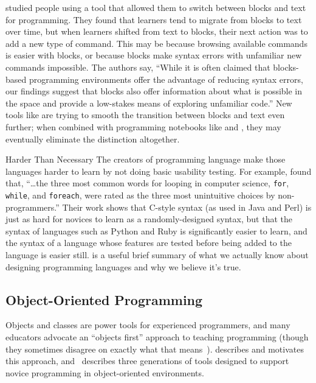 \cite{Wein2017a} studied people using a tool that allowed them to switch between blocks and text for programming. They found that learners tend to migrate from blocks to text over time, but when learners shifted from text to blocks, their next action was to add a new type of command. This may be because browsing available commands is easier with blocks, or because blocks make syntax errors with unfamiliar new commands impossible. The authors say, ``While it is often claimed that blocks-based programming environments offer the advantage of reducing syntax errors, our findings suggest that blocks also offer information about what is possible in the space and provide a low-stakes means of exploring unfamiliar code.'' New tools like  are trying to smooth the transition between blocks and text even further; when combined with programming notebooks like  and , they may eventually eliminate the distinction altogether.

\begin{aside}{Harder Than Necessary}
  The creators of programming language make those languages harder to learn by not doing basic usability testing.
  For example,
  \cite{Stef2013} found that,
  ``{\ldots}the three most common words for looping in computer science,
  \texttt{for}, \texttt{while}, and \texttt{foreach},
  were rated as the three most unintuitive choices by non-programmers.''
  Their work shows that C-style syntax (as used in Java and Perl)
  is just as hard for novices to learn as a randomly-designed syntax,
  but that the syntax of languages such as Python and Ruby is significantly easier to learn,
  and the syntax of a language whose features are tested before being added to the language is easier still.
  \cite{Stef2017} is a useful brief summary of what we actually know about designing programming languages
  and why we believe it's true.
\end{aside}

\subsection*{Object-Oriented Programming}

Objects and classes are power tools for experienced programmers,
and many educators advocate an ``objects first'' approach to teaching programming
(though they sometimes disagree on exactly what that means~\cite{Benn2007b}).
\cite{Sorv2014} describes and motivates this approach,
and~\cite{Koll2015} describes three generations of tools
designed to support novice programming in object-oriented environments.

